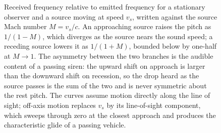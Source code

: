 \begin{figure}[htbp]
\centering
{}
\caption[Doppler frequency ratio versus source Mach number]{Received
frequency relative to emitted frequency for a stationary observer and a
source moving at speed $v_s$, written against the source Mach number
$M=v_s/c$. An approaching source raises the pitch as $1/(1-M)$, which
diverges as the source nears the sound speed; a receding source lowers
it as $1/(1+M)$, bounded below by one-half at $M\to 1$. The asymmetry
between the two branches is the audible content of a passing siren: the
upward shift on approach is larger than the downward shift on recession,
so the drop heard as the source passes is the sum of the two and is
never symmetric about the rest pitch. The curves assume motion directly
along the line of sight; off-axis motion replaces $v_s$ by its
line-of-sight component, which sweeps through zero at the closest
approach and produces the characteristic glide of a passing vehicle.}
\label{fig:vol03ch07:doppler}
\end{figure}
